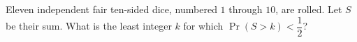 Eleven independent fair ten-sided dice, numbered $1$ through $10$, are rolled. Let $S$ be their sum. What is the least integer $k$ for which $\Pr(S>k)<\dfrac{1}{2}$?
